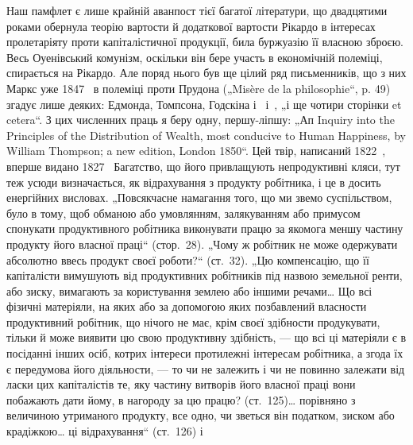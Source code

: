 Наш памфлет є лише крайній аванпост тієї багатої літератури, що
двадцятими роками обернула теорію вартости й додаткової вартости
Рікардо в інтересах пролетаріяту проти капіталістичної продукції, била
буржуазію її власною зброєю. Весь Оуенівський комунізм, оскільки він
бере участь в економічній полеміці, спирається на Рікардо. Але поряд
нього був ще цілий ряд письменників, що з них Маркс уже 1847~ в
полеміці проти Прудона („Misère de la philosophie“, p. 49) згадує лише деяких:
Едмонда, Томпсона, Годскіна і~ і~, „і ще чотири сторінки et
cetera“. З цих численних праць я беру одну, першу-ліпшу: „Ап Inquiry
into the Principles of the Distribution of Wealth, most conducive to Human
Happiness, by William Thompson; a new edition, London 1850“. Цей твір,
написаний 1822~, вперше видано 1827~ Багатство, що його привлащують
непродуктивні кляси, тут теж усюди визначається, як відрахування з
продукту робітника, і це в досить енергійних висловах. „Повсякчасне
намагання того, що ми звемо суспільством, було в тому, щоб обманою
або умовлянням, залякуванням або примусом спонукати продуктивного
робітника виконувати працю за якомога меншу частину продукту його
власної праці“ (стор.~28). „Чому ж робітник не може одержувати абсолютно
ввесь продукт своєї роботи?“ (ст.~32). „Цю компенсацію, що її
капіталісти вимушують від продуктивних робітників під назвою земельної
ренти, або зиску, вимагають за користування землею або іншими речами\dots{}
Що всі фізичні матеріяли, на яких або за допомогою яких позбавлений
власности продуктивний робітник, що нічого не має, крім своєї здібности
продукувати, тільки й може виявити цю свою продуктивну здібність, —
що всі ці матеріяли є в посіданні інших осіб, котрих інтереси протилежні
інтересам робітника, а згода їх є передумова його діяльности, — то чи не
залежить і чи не повинно залежати від ласки цих капіталістів те, яку
частину витворів його власної праці вони побажають дати йому, в
нагороду за цю працю? (ст.~125)\dots{} порівняно з величиною утриманого
продукту, все одно, чи зветься він податком, зиском або крадіжкою\dots{}
ці відрахування“ (ст.~126) і~
